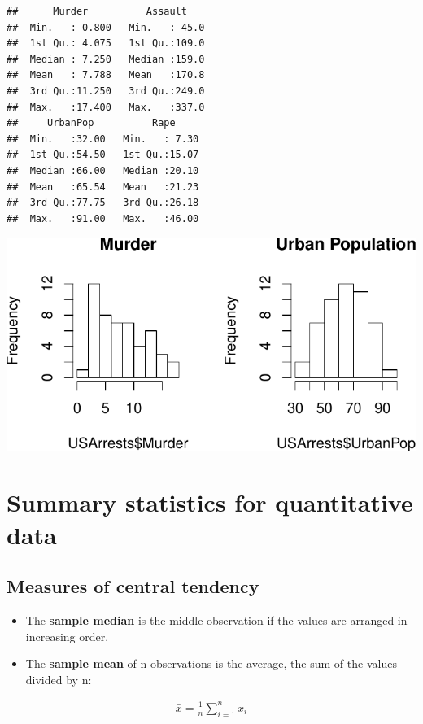 \documentclass[]{tufte-handout}
\newenvironment{Shaded}{}{}
\newcommand{\KeywordTok}[1]{\textcolor[rgb]{0.00,0.44,0.13}{\textbf{#1}}}
\newcommand{\DataTypeTok}[1]{\textcolor[rgb]{0.56,0.13,0.00}{#1}}
\newcommand{\DecValTok}[1]{\textcolor[rgb]{0.25,0.63,0.44}{#1}}
\newcommand{\StringTok}[1]{\textcolor[rgb]{0.25,0.44,0.63}{#1}}
\newcommand{\OperatorTok}[1]{\textcolor[rgb]{0.40,0.40,0.40}{#1}}
\newcommand{\NormalTok}[1]{#1}
\begin{document}
\begin{verbatim}
##      Murder          Assault     
##  Min.   : 0.800   Min.   : 45.0  
##  1st Qu.: 4.075   1st Qu.:109.0  
##  Median : 7.250   Median :159.0  
##  Mean   : 7.788   Mean   :170.8  
##  3rd Qu.:11.250   3rd Qu.:249.0  
##  Max.   :17.400   Max.   :337.0  
##     UrbanPop          Rape      
##  Min.   :32.00   Min.   : 7.30  
##  1st Qu.:54.50   1st Qu.:15.07  
##  Median :66.00   Median :20.10  
##  Mean   :65.54   Mean   :21.23  
##  3rd Qu.:77.75   3rd Qu.:26.18  
##  Max.   :91.00   Max.   :46.00
\end{verbatim}

\begin{Shaded}
\end{Shaded}

\includegraphics{data_collection_summary_files/figure-latex/unnamed-chunk-2-1}

\section{Summary statistics for quantitative
data}\label{summary-statistics-for-quantitative-data}

\subsection{Measures of central
tendency}\label{measures-of-central-tendency}

\begin{itemize}
\item
  The \textbf{sample median} is the middle observation if the values are
  arranged in increasing order.
\item
  The \textbf{sample mean} of n observations is the average, the sum of
  the values divided by n:
\end{itemize}

\begin{align}
\bar{x} = \frac{1}{n}\sum_{i=1}^n x_i
\end{align}
\end{document}
